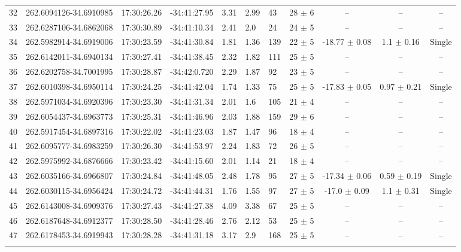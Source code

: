 \documentclass[longauth]{aa} %
\begin{document}
\begin{appendix}
\begin{table}[htbp!]
\begin{tabular}{llllllllccc}
32  &  262.6094126-34.6910985  &  17:30:26.26  &  -34:41:27.95  &  3.31  &  2.99  &  43  &  28 $\pm$ 6  &  --  &  --  &  -- \\
33  &  262.6287106-34.6862068  &  17:30:30.89  &  -34:41:10.34  &  2.41  &  2.0  &  24  &  24 $\pm$ 5  &  --  &  --  &  -- \\
34  &  262.5982914-34.6919006  &  17:30:23.59  &  -34:41:30.84  &  1.81  &  1.36  &  139  &  22 $\pm$ 5  &  -18.77 $\pm$ 0.08  &  1.1 $\pm$ 0.16  &  Single \\
35  &  262.6142011-34.6940134  &  17:30:27.41  &  -34:41:38.45  &  2.32  &  1.82  &  111  &  25 $\pm$ 5  &  --  &  --  &  -- \\
36  &  262.6202758-34.7001995  &  17:30:28.87  &  -34:42:0.720  &  2.29  &  1.87  &  92  &  23 $\pm$ 5  &  --  &  --  &  -- \\
37  &  262.6010398-34.6950114  &  17:30:24.25  &  -34:41:42.04  &  1.74  &  1.33  &  75  &  25 $\pm$ 5  &  -17.83 $\pm$ 0.05  &  0.97 $\pm$ 0.21  &  Single \\
38  &  262.5971034-34.6920396  &  17:30:23.30  &  -34:41:31.34  &  2.01  &  1.6  &  105  &  21 $\pm$ 4  &  --  &  --  &  -- \\
39  &  262.6054437-34.6963773  &  17:30:25.31  &  -34:41:46.96  &  2.03  &  1.88  &  159  &  29 $\pm$ 6  &  --  &  --  &  -- \\
40  &  262.5917454-34.6897316  &  17:30:22.02  &  -34:41:23.03  &  1.87  &  1.47  &  96  &  18 $\pm$ 4  &  --  &  --  &  -- \\
41  &  262.6095777-34.6983259  &  17:30:26.30  &  -34:41:53.97  &  2.24  &  1.83  &  72  &  26 $\pm$ 5  &  --  &  --  &  -- \\
42  &  262.5975992-34.6876666  &  17:30:23.42  &  -34:41:15.60  &  2.01  &  1.14  &  21  &  18 $\pm$ 4  &  --  &  --  &  -- \\
43  &  262.6035166-34.6966807  &  17:30:24.84  &  -34:41:48.05  &  2.48  &  1.78  &  95  &  27 $\pm$ 5  &  -17.34 $\pm$ 0.06  &  0.59 $\pm$ 0.19  &  Single \\
44  &  262.6030115-34.6956424  &  17:30:24.72  &  -34:41:44.31  &  1.76  &  1.55  &  97  &  27 $\pm$ 5  &  -17.0 $\pm$ 0.09  &  1.1 $\pm$ 0.31  &  Single \\
45  &  262.6143008-34.6909376  &  17:30:27.43  &  -34:41:27.38  &  4.09  &  3.38  &  67  &  25 $\pm$ 5  &  --  &  --  &  -- \\
46  &  262.6187648-34.6912377  &  17:30:28.50  &  -34:41:28.46  &  2.76  &  2.12  &  53  &  25 $\pm$ 5  &  --  &  --  &  -- \\
47  &  262.6178453-34.6919943  &  17:30:28.28  &  -34:41:31.18  &  3.17  &  2.9  &  168  &  25 $\pm$ 5  &  --  &  --  &  -- \\
\hline \noalign {\smallskip}
\end{tabular}
\end{table}



\end{appendix}
\end{document}
